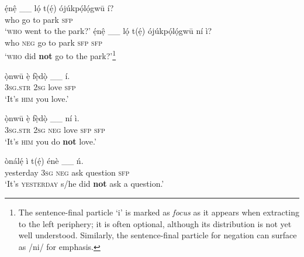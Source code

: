 \documentclass[output=paper,colorlinks,citecolor=brown,
]{langscibook}
\begin{document}
\ea %
\label{ex:chaperon:subjqst}
    \begin{xlist} \ex\gll  \'{ẹ}n\^{ẹ} \_\_ l\'{ọ} t(\'{ẹ}) \'{o}j\'{u}kp\'{ọ}l\'{ọ}gw\={u} \'{i}?\\
        who  {}       go    to     park             \textsc{sfp}\\
       \glt  `\textsc{who} went to the park?'
    \ex\gll \'{ẹ}n\^{ẹ} \_\_  l\'{ọ} t(\'{ẹ}) \'{o}j\'{u}kp\'{ọ}l\'{ọ}gw\={u} n\'{i} \`{i}? \\
        who   {}  \textsc{neg}     go     to     park             \textsc{sfp} \textsc{sfp} \\
       \glt  `\textsc{who} did \textbf{not} go to the park?'\footnote{The sentence-final particle `i' is marked as \textit{focus} as it appears when extracting to the left periphery; it is often optional, although its distribution is not yet well understood. Similarly, the sentence-final particle for negation can surface as /ni/ for emphasis.}
\end{xlist}
\z
\ea %
\label{ex:chaperon:objqst}
    \begin{xlist} \ex\gll  \`{ọ}nw\={u}         \`{ẹ}     f\`{ẹ}d\`{ọ}  \_\_   \'{i}.\\
    \textsc{3sg}.\textsc{str}     \textsc{2sg}     love  {}   \textsc{sfp}\\
    \glt `It's \textsc{him} you love.'
    
    \ex\gll \`{ọ}nw\={u}         \`{ẹ}          f\`{ẹ}d\`{ọ} \_\_ n\'{i} \`{i}.\\
    \textsc{3sg}.\textsc{str}     \textsc{2sg}     \textsc{neg}     love {} \textsc{sfp} \textsc{sfp}    \\
    \glt `It's \textsc{him} you do \textbf{not} love.'
\end{xlist}
\z


\ea %
\label{ex:chaperon:adjunct}
\gll \`{o}n\'{a}l\'{ẹ}   \`{i}          t(\'{ẹ})         \'{e}nè  \_\_      ń.\\
yesterday    \textsc{3sg}     \textsc{neg}      ask       question  {}   \textsc{sfp}\\
\glt `It's \textsc{yesterday} s/he did \textbf{not}  ask a question.'
\z
\end{document}
